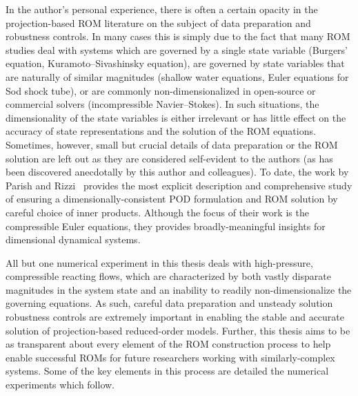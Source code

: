 In the author's personal experience, there is often a certain opacity in the projection-based ROM literature on the subject of data preparation and robustness controls. In many cases this is simply due to the fact that many ROM studies deal with systems which are governed by a single state variable (Burgers' equation, Kuramoto--Sivashinsky equation), are governed by state variables that are naturally of similar magnitudes (shallow water equations, Euler equations for Sod shock tube), or are commonly non-dimensionalized in open-source or commercial solvers (incompressible Navier--Stokes). In such situations, the dimensionality of the state variables is either irrelevant or has little effect on the accuracy of state representations and the solution of the ROM equations. Sometimes, however, small but crucial details of data preparation or the ROM solution are left out as they are considered self-evident to the authors (as has been discovered anecdotally by this author and colleagues). To date, the work by Parish and Rizzi~\cite{Parish2022} provides the most explicit description and comprehensive study of ensuring a dimensionally-consistent POD formulation and ROM solution by careful choice of inner products. Although the focus of their work is the compressible Euler equations, they provides broadly-meaningful insights for dimensional dynamical systems.

All but one numerical experiment in this thesis deals with high-pressure, compressible reacting flows, which are characterized by both vastly disparate magnitudes in the system state and an inability to readily non-dimensionalize the governing equations. As such, careful data preparation and unsteady solution robustness controls are extremely important in enabling the stable and accurate solution of projection-based reduced-order models. Further, this thesis aims to be as transparent about every element of the ROM construction process to help enable successful ROMs for future researchers working with similarly-complex systems. Some of the key elements in this process are detailed the numerical experiments which follow.